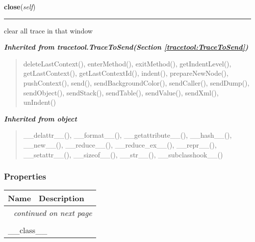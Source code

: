     \label{tracetool:WinTrace:close}

    \vspace{0.5ex}

\hspace{.8\funcindent}\begin{boxedminipage}{\funcwidth}

    \raggedright \textbf{close}(\textit{self})

    \vspace{-1.5ex}

    \rule{\textwidth}{0.5\fboxrule}
\setlength{\parskip}{2ex}
    clear all trace in that window

\setlength{\parskip}{1ex}
    \end{boxedminipage}


\large{\textbf{\textit{Inherited from tracetool.TraceToSend\textit{(Section \ref{tracetool:TraceToSend})}}}}

\begin{quote}
deleteLastContext(), enterMethod(), exitMethod(), getIndentLevel(), getLastContext(), getLastContextId(), indent(), prepareNewNode(), pushContext(), send(), sendBackgroundColor(), sendCaller(), sendDump(), sendObject(), sendStack(), sendTable(), sendValue(), sendXml(), unIndent()
\end{quote}

\large{\textbf{\textit{Inherited from object}}}

\begin{quote}
\_\_delattr\_\_(), \_\_format\_\_(), \_\_getattribute\_\_(), \_\_hash\_\_(), \_\_new\_\_(), \_\_reduce\_\_(), \_\_reduce\_ex\_\_(), \_\_repr\_\_(), \_\_setattr\_\_(), \_\_sizeof\_\_(), \_\_str\_\_(), \_\_subclasshook\_\_()
\end{quote}


  \subsubsection{Properties}

    \vspace{-1cm}
\hspace{\varindent}\begin{longtable}{|p{\varnamewidth}|p{\vardescrwidth}|l}
\cline{1-2}
\cline{1-2} \centering \textbf{Name} & \centering \textbf{Description}& \\
\cline{1-2}
\endhead\cline{1-2}\multicolumn{3}{r}{\small\textit{continued on next page}}\\\endfoot\cline{1-2}
\endlastfoot\multicolumn{2}{|l|}{\textit{Inherited from object}}\\
\multicolumn{2}{|p{\varwidth}|}{\raggedright \_\_class\_\_}\\
\cline{1-2}
\end{longtable}


